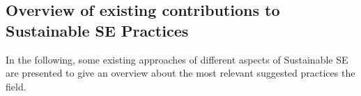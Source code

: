 \documentclass[oribibl]{llncs}
\begin{document}


\subsection{Overview of existing contributions to Sustainable SE Practices}%
In the following, some existing approaches of different aspects of Sustainable SE are presented to give an overview about the most relevant suggested practices the field. %

\end{document}
